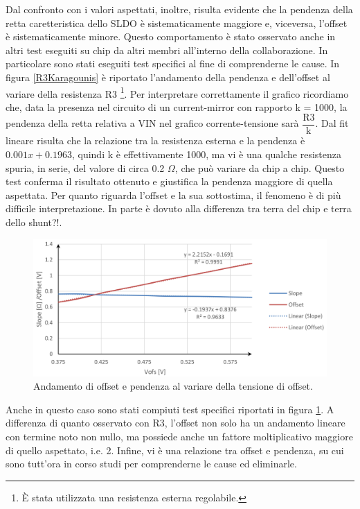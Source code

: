 Dal confronto con i valori aspettati, inoltre, risulta evidente che la pendenza della retta caretteristica dello SLDO è sistematicamente maggiore e, viceversa, l'offset è sistematicamente minore. 
Questo comportamento è stato osservato anche in altri test eseguiti su chip da altri membri all'interno della collaborazione.
In particolare sono stati eseguiti test specifici al fine di comprenderne le cause. 
In figura \ref{R3Karagounis} è riportato l'andamento della pendenza e dell'offset al variare della resistenza R3
\footnote{
  \`E stata utilizzata una resistenza esterna regolabile.
}.
Per interpretare correttamente il grafico ricordiamo che, data la presenza nel circuito di un current-mirror con rapporto k = 1000, la pendenza della retta relativa a VIN nel grafico corrente-tensione sarà $\mathrm{\dfrac{R3}{k}}$. 
Dal fit lineare risulta che la relazione tra la resistenza esterna e la pendenza è $0.001x + 0.1963$, quindi k è effettivamente 1000, ma vi è una qualche resistenza spuria, in serie, del valore di circa 0.2 $\Omega$, che può variare da chip a chip. 
Questo test conferma il risultato ottenuto e giustifica la pendenza maggiore di quella aspettata. 
Per quanto riguarda l'offset e la sua sottostima, il fenomeno è di più difficile interpretazione.
In parte è dovuto alla differenza tra terra del chip e terra dello shunt?!.
\begin{figure}
\centering
\includegraphics[width=\textwidth]{Immagini/OffsetKaragounis}
\caption{Andamento di offset e pendenza al variare della tensione di offset.}%
\label{OffsetKaragounis}
\end{figure}
Anche in questo caso sono stati compiuti test specifici riportati in figura \ref{OffsetKaragounis}. 
A differenza di quanto osservato con R3, l'offset non solo ha un andamento lineare con termine noto non nullo, ma possiede anche un fattore moltiplicativo maggiore di quello aspettato, i.e. 2. 
Infine, vi è una relazione tra offset e pendenza, su cui sono tutt'ora in corso studi per comprenderne le cause ed eliminarle.

